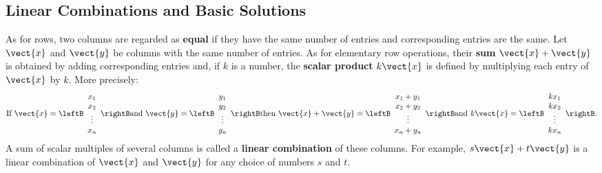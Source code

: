\subsection*{Linear Combinations and Basic Solutions}

As for rows, two columns are regarded as \textbf{equal} if they have the same number of entries and corresponding entries are the same. Let $\vect{x}$ and $\vect{y}$ be columns with the same number of entries. As for elementary row operations, their \textbf{sum} $\vect{x} + \vect{y}$ is obtained by adding corresponding entries and, if $k$ is a number, the \textbf{scalar product} $k\vect{x}$ is defined by multiplying each entry of $\vect{x}$ by $k$. More precisely:
\begin{equation*}
\mbox{If } \vect{x} = 
\leftB \begin{array}{c}
	x_1 \\
	x_2 \\
	\vdots \\
	x_n
\end{array} \rightB
\mbox{and } \vect{y} =
\leftB \begin{array}{c}
	y_1 \\
	y_2 \\
	\vdots \\
	y_n
\end{array} \rightB
\mbox{then } \vect{x} + \vect{y} =
\leftB \begin{array}{c}
	x_1 + y_1 \\
	x_2 + y_2 \\
	\vdots \\
	x_n + y_n
\end{array} \rightB
\mbox{and } k\vect{x} =
\leftB \begin{array}{c}
	kx_1 \\
	kx_2 \\
	\vdots \\
	kx_n
\end{array} \rightB.
\end{equation*}
A sum of scalar multiples of several columns is called a \textbf{linear combination} of these columns. For example, $s\vect{x} + t\vect{y}$ is a linear combination of $\vect{x}$ and $\vect{y}$ for any choice of numbers $s$ and $t$.

